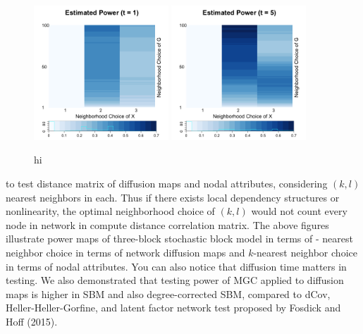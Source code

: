 \documentclass[simplex.tex]{subfiles}
\begin{document}
\begin{figure}[h!]
\begin{cframed}
\centering
\includegraphics[width=0.45\textwidth]{./figs/msnt1.png}
\includegraphics[width=0.45\textwidth]{./figs/msnt2.png}
\caption{
  hi
}
\label{fig:msnt}
\end{cframed}
\end{figure}

to test distance matrix of diffusion maps and nodal attributes,
considering $(k,l)$  nearest neighbors in each. Thus if there exists
local dependency structures or nonlinearity, the optimal neighborhood
choice of $(k,l)$ would not count every node in network in compute
distance correlation matrix. The above figures illustrate power maps of
three-block stochastic block model in terms of - nearest neighbor choice
in terms of network diffusion maps and $k$-nearest neighbor choice in
terms of nodal attributes. You can also notice that diffusion time
matters in testing. We also demonstrated that testing power of MGC
applied to diffusion maps is higher in SBM and also degree-corrected
SBM, compared to dCov, Heller-Heller-Gorfine, and latent factor network
test proposed by Fosdick and Hoff (2015).
\end{document}
